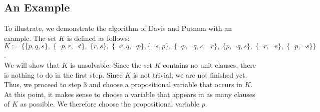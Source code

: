 \subsection{An Example}
To illustrate, we demonstrate the algorithm of Davis and Putnam with an example.
The set $K$ is defined as follows: \\[0.2cm]
\hspace*{-0.3cm}
$K := \Big\{ \{p, q, s\},\; \{\neg p, r, \neg t\},\; \{r, s\},\; \{\neg r, q, \neg p\}, 
             \{\neg s, p\},\; \{\neg p, \neg q, s, \neg r\},\; \{p, \neg q, s\},\; \{\neg r, \neg s\},\;
             \{\neg p, \neg s\} 
      \Big\}$. 
\\[0.2cm]
We will show that $K$ is unsolvable. Since the
set $K$ contains no unit clauses, there is nothing to do in the first step. Since $K$ is not
trivial, we are not finished yet. Thus, we proceed to step 3 and choose
a propositional variable that occurs in $K$. At this point, it makes sense
to choose a variable that appears in as many clauses of $K$ as possible. We therefore choose
the propositional variable $p$.
